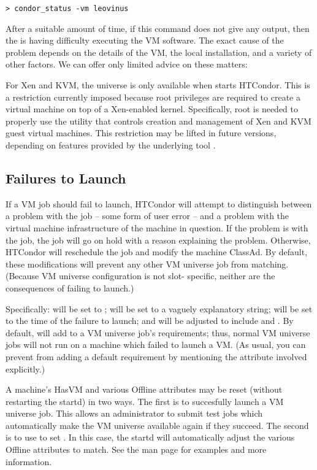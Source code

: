 \begin{verbatim}
> condor_status -vm leovinus
\end{verbatim}

After a suitable amount of time, if this command does not give any output,
then the  is having difficulty executing the VM software.
The exact cause of the problem depends on the details of the VM, the local 
installation, and a variety of other factors. We can offer only limited 
advice on these matters:

For Xen and KVM,
the  universe is only available when  starts HTCondor.
This is a restriction currently imposed because root privileges are 
required to create a virtual machine on top of a Xen-enabled kernel.
Specifically, root is needed 
to properly use the  utility that controls 
creation and management of Xen and KVM guest virtual machines.
This restriction may be lifted in future versions,
depending on features provided by the underlying tool .

\subsection{Failures to Launch}

If a VM job should fail to launch, HTCondor will attempt to distinguish
between a problem with the job -- some form of user error -- and a problem
with the virtual machine infrastructure of the machine in question.  If the
problem is with the job, the job will go on hold with a reason explaining
the problem.  Otherwise, HTCondor will reschedule the job and modify the
machine ClassAd.  By default, these modifications will prevent any other VM
universe job from matching.  (Because VM universe configuration is not slot-
specific, neither are the consequences of failing to launch.)

Specifically:  will be set to ; 
will be set to a vaguely explanatory string;  will be
set to the time of the failure to launch; and  will be
adjusted to include  and .  By default, 
will add  to a VM universe job's requirements; thus,
normal VM universe jobs will not run on a machine which failed to launch
a VM.  (As usual, you can prevent  from adding a default
requirement by mentioning the attribute involved explicitly.)

A machine's HasVM and various Offline attributes may be reset (without
restarting the startd) in two ways.  The first is to succesfully launch
a VM universe job.  This allows an administrator to submit test jobs which
automatically make the VM universe available again if they succeed.  The
second is to use  to set .  In
this case, the startd will automatically adjust the various Offline
attributes to match.  See the  man page for
examples and more information.

